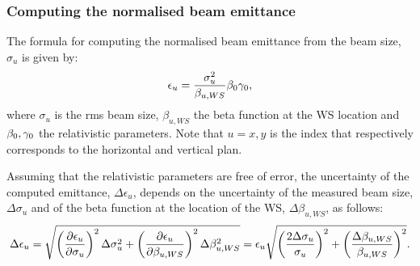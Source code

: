 \subsubsection*{Computing the normalised beam emittance}
The formula for computing the normalised beam emittance from the beam size, $\sigma_u$ is given by:
\begin{equation}\label{eq:emittance_from_WS}
   \centering
   \epsilon_u = \frac{\sigma_u^2}{\beta_{u, WS}} \betarel \gammarel ,
\end{equation}
where $\sigma_u$ is the rms beam size, $\beta_{u, WS}$ the beta function at the WS location and ${\beta_0}, {\gamma_0}$ the relativistic parameters. Note that $u=x,y$ is the index that respectively corresponds to the horizontal and vertical plan.

Assuming that the relativistic parameters are free of error, the uncertainty of the computed emittance, $\Delta \epsilon_u$, depends on the uncertainty of the measured beam size, $\Delta \sigma_u$ and of the beta function at the location of the WS, $\Delta \beta_{u, WS}$, as follows:
\begin{equation}\label{eq:emittance_from_WS_uncertainty}
   \centering
   \Delta \epsilon_u = \sqrt{\left ( \frac{\partial \epsilon_u}{\partial \sigma_u}\right )^2 \Delta \sigma_u^2 + \left ( \frac{\partial \epsilon_u}{\partial \beta_{u, WS}} \right )^2 \Delta \beta_{u, WS}^2} = \epsilon_u  \sqrt{\left ( \frac{2 \Delta \sigma_u}{\sigma_u}\right )^2 + \left ( \frac{ \Delta \beta_{u, WS}}{\beta_{u, WS}} \right )^2} .
\end{equation}

